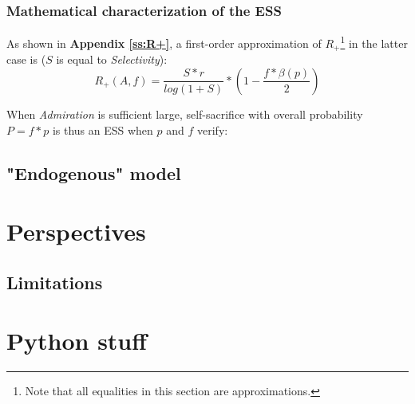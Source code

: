 \documentclass[a4paper,12pt]{article}
\begin{document}
\subsubsection{Mathematical characterization of the ESS}



As shown in \textbf{Appendix \ref{ss:R+}}, a first-order approximation of $R_+$\footnote{Note that 
all equalities in this section are approximations.} in the latter case is ($S$ is equal to \emph{Selectivity}):
\begin{equation}
    R_+(A,f) = \frac{S*r}{log(1+S)} * (1 - \frac{f*\beta(p)}{2})
\label{eq:R+}
\end{equation}

When \emph{Admiration} is sufficient large, self-sacrifice with overall probability $P=f*p$ is thus an ESS
when $p$ and $f$ verify:























\subsection{"Endogenous" model}


\section{Perspectives}
\subsection{Limitations}
\appendix

\section{Python stuff}
\end{document}
